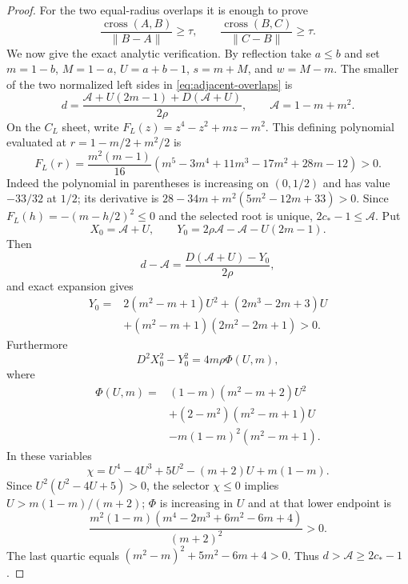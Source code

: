 \begin{proof}
For the two equal-radius overlaps it is enough to prove
\begin{equation}
 \frac{\operatorname{cross}(A,B)}{\lVert B-A\rVert}\ge\tau,
 \qquad
 \frac{\operatorname{cross}(B,C)}{\lVert C-B\rVert}\ge\tau.  \label{eq:adjacent-overlaps}
\end{equation}
We now give the exact analytic verification.  By reflection take $a\le b$ and
set $m=1-b$, $M=1-a$, $U=a+b-1$, $s=m+M$, and $w=M-m$.  The smaller of the
two normalized left sides in \eqref{eq:adjacent-overlaps} is
\begin{equation}
 d=\frac{\mathcal A+U(2m-1)+D(\mathcal A+U)}{2\rho},
 \qquad \mathcal A=1-m+m^2.                      \label{eq:adjacent-d}
\end{equation}
On the $C_L$ sheet, write $F_L(z)=z^4-z^2+mz-m^2$.  This defining
polynomial evaluated at
$r=1-m/2+m^2/2$ is
\[
 F_L(r)=\frac{m^2(m-1)}{16}
 (m^5-3m^4+11m^3-17m^2+28m-12)>0.
\]
Indeed the polynomial in parentheses is increasing on $(0,1/2)$ and has
value $-33/32$ at $1/2$; its derivative is
$28-34m+m^2(5m^2-12m+33)>0$.  Since
$F_L(h)=-(m-h/2)^2\le0$ and the selected
root is unique, $2c_*-1\le\mathcal A$.  Put
\[
 X_0=\mathcal A+U,
 \qquad
 Y_0=2\rho\mathcal A-\mathcal A-U(2m-1).
\]
Then
\[
 d-\mathcal A=\frac{D(\mathcal A+U)-Y_0}{2\rho},
\]
and exact expansion gives
\[
\begin{aligned}
 Y_0={}&2(m^2-m+1)U^2+(2m^3-2m+3)U\\
      &+(m^2-m+1)(2m^2-2m+1)>0.
\end{aligned}
\]
Furthermore
\[
 D^2X_0^2-Y_0^2=4m\rho\Phi(U,m),
\]
where
\[
\begin{aligned}
 \Phi(U,m)={}&(1-m)(m^2-m+2)U^2\\
 &+(2-m^2)(m^2-m+1)U\\
 &-m(1-m)^2(m^2-m+1).
\end{aligned}
\]
In these variables
\[
 \chi=U^4-4U^3+5U^2-(m+2)U+m(1-m).
\]
Since $U^2(U^2-4U+5)>0$, the selector $\chi\le0$ implies
$U>m(1-m)/(m+2)$; $\Phi$ is increasing in $U$ and at that lower endpoint is
\[
 \frac{m^2(1-m)(m^4-2m^3+6m^2-6m+4)}{(m+2)^2}>0.
\]
The last quartic equals $(m^2-m)^2+5m^2-6m+4>0$.
Thus $d>\mathcal A\ge2c_*-1$.


\end{proof}
